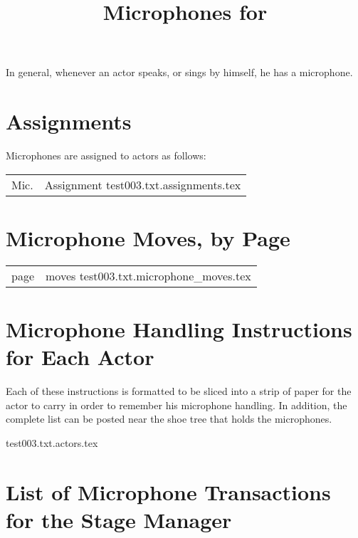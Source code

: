 \documentclass[letterpaper]{article}
\title{Microphones for {\ParameterShowName}}
\author{\ParameterDesigner}
\date{\ParameterDateNumeric}
\begin{document}
\maketitle
\tableofcontents
\newpage

In general, whenever an actor speaks, or sings by himself, he has a microphone.

\section {Assignments}
Microphones are assigned to actors as follows:

\begin{center}
\begin{longtable}{|l|m{7in}|}
\hline Mic. & Assignment \endhead \hline
 {test003.txt.assignments.tex}
\end{longtable}
\end{center}

\section {Microphone Moves, by Page}

\begin{center}
\begin{longtable}{|l|m{7in}|}
\hline page & moves \endhead \hline
 {test003.txt.microphone_moves.tex}
\end{longtable}
\end{center}

\section {Microphone Handling Instructions for Each Actor}

Each of these instructions is formatted to be sliced into a strip of paper
for the actor to carry in order to remember his microphone handling.
In addition, the complete list can be posted near the shoe tree that
holds the microphones.

\vskip 0.25in
{\setlength{\parindent}{0in}
 {test003.txt.actors.tex}
}

\section {List of Microphone Transactions for the Stage Manager}
\end{document}
